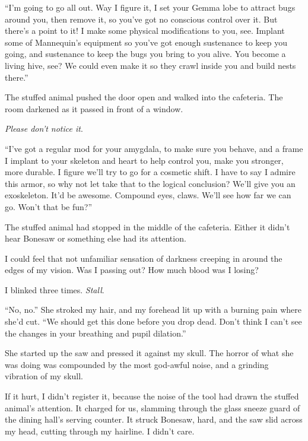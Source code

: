 ``I'm going to go all out.  Way I figure it, I set your Gemma lobe to attract bugs around you, then remove it, so you've got no conscious control over it.  But there's a point to it!  I make some physical modifications to you, see.  Implant some of Mannequin's equipment so you've got enough sustenance to keep you going, and sustenance to keep the bugs you bring to you alive.  You become a living hive, see?  We could even make it so they crawl inside you and build nests there.''



The stuffed animal pushed the door open and walked into the cafeteria.  The room darkened as it passed in front of a window.



\emph{Please don't notice it}.



``I've got a regular mod for your amygdala, to make sure you behave, and a frame I implant to your skeleton and heart to help control you, make you stronger, more durable.  I figure we'll try to go for a cosmetic shift.  I have to say I admire this armor, so why not let take that to the logical conclusion?  We'll give you an exoskeleton.  It'd be awesome.  Compound eyes, claws.  We'll see how far we can go.  Won't that be fun?''



The stuffed animal had stopped in the middle of the cafeteria.  Either it didn't hear Bonesaw or something else had its attention.



I could feel that not unfamiliar sensation of darkness creeping in around the edges of my vision.  Was I passing out?  How much blood was I losing?



I blinked three times.  \emph{Stall}.



``No, no.''  She stroked my hair, and my forehead lit up with a burning pain where she'd cut.  ``We should get this done before you drop dead.  Don't think I can't see the changes in your breathing and pupil dilation.''



She started up the saw and pressed it against my skull.  The horror of what she was doing was compounded by the most god-awful noise, and a grinding vibration of my skull.



If it hurt, I didn't register it, because the noise of the tool had drawn the stuffed animal's attention.  It charged for us, slamming through the glass sneeze guard of the dining hall's serving counter.  It struck Bonesaw, hard, and the saw slid across my head, cutting through my hairline.  I didn't care.



